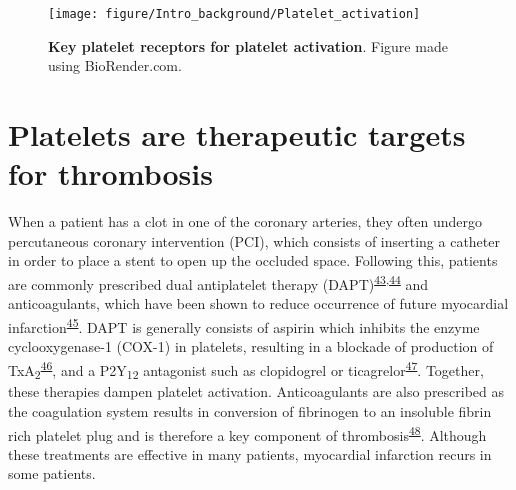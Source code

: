 \documentclass[11pt,twoside]{bristolthesis}
\begin{document}
\begin{figure}

{\centering \texttt{[image: figure/Intro\_background/Platelet\_activation]} 

}

\caption[Key platelet receptors for platelet activation]{\textbf{Key platelet receptors for platelet activation}. Figure made using BioRender.com.}\label{fig:platelet-activation-receptors}
\end{figure}
\hypertarget{platelets-are-therapeutic-targets-for-thrombosis}{%
\section{Platelets are therapeutic targets for thrombosis}\label{platelets-are-therapeutic-targets-for-thrombosis}}

When a patient has a clot in one of the coronary arteries, they often undergo percutaneous coronary intervention (PCI), which consists of inserting a catheter in order to place a stent to open up the occluded space. Following this, patients are commonly prescribed dual antiplatelet therapy (DAPT)\textsuperscript{\protect\hyperlink{ref-Freynhofer2017a}{43},\protect\hyperlink{ref-Nardin2015}{44}} and anticoagulants, which have been shown to reduce occurrence of future myocardial infarction\textsuperscript{\protect\hyperlink{ref-Khan2020}{45}}. DAPT is generally consists of aspirin which inhibits the enzyme cyclooxygenase-1 (COX-1) in platelets, resulting in a blockade of production of TxA\textsubscript{2}\textsuperscript{\protect\hyperlink{ref-Warner2011}{46}}, and a P2Y\textsubscript{12} antagonist such as clopidogrel or ticagrelor\textsuperscript{\protect\hyperlink{ref-Degrauwe2017}{47}}. Together, these therapies dampen platelet activation. Anticoagulants are also prescribed as the coagulation system results in conversion of fibrinogen to an insoluble fibrin rich platelet plug and is therefore a key component of thrombosis\textsuperscript{\protect\hyperlink{ref-Grover2019}{48}}. Although these treatments are effective in many patients, myocardial infarction recurs in some patients.
\end{document}
